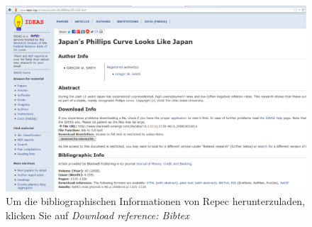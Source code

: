 \documentclass[a4paper,12pt]{scrartcl} %
\begin{document}
\begin{figure}[h!] %
\includegraphics[scale=0.3]{Ideas}  %
\caption[Titel für Abbildungsverzeichnis]{Um die bibliographischen Informationen von Repec herunterzuladen, klicken Sie auf \emph{Download reference: Bibtex}}\label{fig:Ideas1} %
\end{figure}
\end{document}
